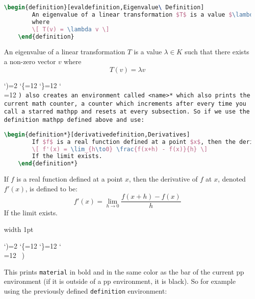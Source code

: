 \documentclass[10pt]{article}
\def\showcase{\medskip\bgroup \color{showcasecolor} \leavevmode\vrule width 1pt \strut \aftergroup\medskip \catcode`)=2 \catcode`\{=12 \catcode`\}=12 \catcode`\\=12 \bftt\ \let\next=}
\def\macrocalls{\bgroup \color{showcasecolor} \catcode`)=2 \catcode`\{=12 \catcode`\}=12 \catcode`\\=12 \tt \let\next=}
\begin{document}
\begin{bluebox}
\begin{lstlisting}[language=tex]
	\begin{definition}[evaldefinition,Eigenvalue\ Definition]
		An eigenvalue of a linear transformation $T$ is a value $\lambda\in K$ such that there exists a non-zero vector $v$
		where
		\[ T(v) = \lambda v \]
	\end{definition}
\end{lstlisting}
                                                                                                                        
\begin{definition}
	An eigenvalue of a linear transformation $T$ is a value $\lambda\in K$ such that there exists a non-zero vector $v$
	where
	\[ T(v) = \lambda v \]
\end{definition}

\macrocalls(\newmathpp) also creates an environment called {\tt <name>*} which also prints the current math counter, a counter
which increments after every time you call a starred mathpp and resets at every subsection.
So if we use the {\tt definition} mathpp defined above and use:

\begin{lstlisting}[language=tex]
	\begin{definition*}[derivativedefinition,Derivatives]
		If $f$ is a real function defined at a point $x$, then the derivative of $f$ at $x$, denoted $f'(x)$, is defined to be:
		\[ f'(x) = \lim_{h\to0} \frac{f(x+h) - f(x)}{h} \]
		If the limit exists.
	\end{definition*}
\end{lstlisting}

\setcounter{section}{1} \setcounter{subsection}{1}

\begin{definition*}
	If $f$ is a real function defined at a point $x$, then the derivative of $f$ at $x$, denoted $f'(x)$, is defined to be:
	\[ f'(x) = \lim_{h\to0} \frac{f(x+h) - f(x)}{h} \]
	If the limit exists.
\end{definition*}

\showcase()

This prints {\tt material} in bold and in the same color as the bar of the current pp environment (if it is outside of a pp
environment, it is black).
So for example using the previously defined {\tt definition} environment:


\end{bluebox}
\end{document}
